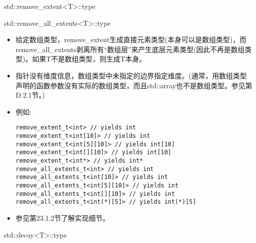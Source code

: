 std::remove\_extent<T>::type

std::remove\_all\_extents<T>::type

\begin{itemize}
\item
给定数组类型，remove\_extent生成直接元素类型(本身可以是数组类型)，而remove\_all\_extents剥离所有“数组层”来产生底层元素类型(因此不再是数组类型)。如果T不是数组类型，则生成T本身。

\item
指针没有维度信息，数组类型中未指定的边界指定维度。(通常，用数组类型声明的函数参数没有实际的数组类型，而且std::array也不是数组类型。参见第D.2.1节。)

\item
例如:
\begin{lstlisting}[style=styleCXX]
remove_extent_t<int> // yields int
remove_extent_t<int[10]> // yields int
remove_extent_t<int[5][10]> // yields int[10]
remove_extent_t<int[][10]> // yields int[10]
remove_extent_t<int*> // yields int*
remove_all_extents_t<int> // yields int
remove_all_extents_t<int[10]> // yields int
remove_all_extents_t<int[5][10]> // yields int
remove_all_extents_t<int[][10]> // yields int
remove_all_extents_t<int(*)[5]> // yields int(*)[5]
\end{lstlisting}

\item
参见第23.1.2节了解实现细节。
\end{itemize}

std::decay<T>::type

